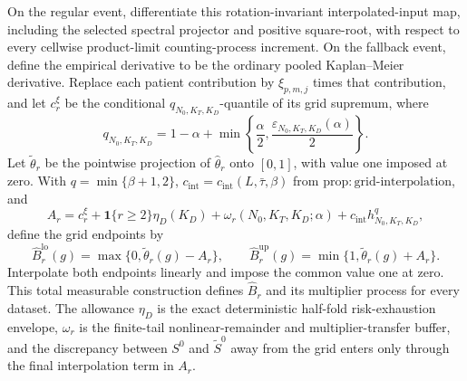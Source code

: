On the regular event, differentiate this rotation-invariant interpolated-input map, including the selected spectral projector and positive square-root, with respect to every cellwise product-limit counting-process increment. On the fallback event, define the empirical derivative to be the ordinary pooled Kaplan--Meier derivative. Replace each patient contribution by \(\xi_{p,m,j}\) times that contribution, and let \(c_r^\xi\) be the conditional \(q_{N_0,K_T,K_D}\)-quantile of its grid supremum, where
\[
 q_{N_0,K_T,K_D}=1-\alpha+
 \min\left\{\frac{\alpha}{2},\frac{\varepsilon_{N_0,K_T,K_D}(\alpha)}{2}\right\}.
\]
Let \(\widetilde\theta_r\) be the pointwise projection of \(\widehat\theta_r\) onto \([0,1]\), with value one imposed at zero. With \(q=\min\{\beta+1,2\}\), \(c_{\mathrm{int}}=c_{\mathrm{int}}(L,\bar\tau,\beta)\) from \(\mathrm{prop:grid\mbox{-}interpolation}\), and
\[
 A_r=c_r^\xi+\mathbf 1\{r\ge2\}\eta_D(K_D)
     +\omega_r(N_0,K_T,K_D;\alpha)
     +c_{\mathrm{int}}h_{N_0,K_T,K_D}^{q},
\]
define the grid endpoints by
\[
 \widehat B_r^{\mathrm{lo}}(g)=\max\{0,\widetilde\theta_r(g)-A_r\},
 \qquad
 \widehat B_r^{\mathrm{up}}(g)=\min\{1,\widetilde\theta_r(g)+A_r\}.
\]
Interpolate both endpoints linearly and impose the common value one at zero. This total measurable construction defines \(\widehat B_r\) and its multiplier process for every dataset. The allowance \(\eta_D\) is the exact deterministic half-fold risk-exhaustion envelope, \(\omega_r\) is the finite-tail nonlinear-remainder and multiplier-transfer buffer, and the discrepancy between \(S^0\) and \(\widetilde S^0\) away from the grid enters only through the final interpolation term in \(A_r\).
